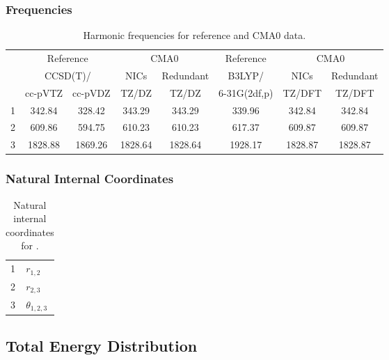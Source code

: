 \documentclass[10pt,oneside]{article}
\begin{document}
\begin{table}[h!]
\subsubsection*{Frequencies}
\centering
\caption{Harmonic frequencies for reference and CMA0 data.}
\begin{tabular}{cccccccc}
\toprule
{} & \multicolumn{2}{c}{Reference} & \multicolumn{2}{c}{CMA0} &    Reference & \multicolumn{2}{c}{CMA0} \\
{} & \multicolumn{2}{c}{CCSD(T)/} &    NICs &  Redundant &       B3LYP/ &    NICs & Redundant \\
{} &   cc-pVTZ & cc-pVDZ &   TZ/DZ &      TZ/DZ & 6-31G(2df,p) &  TZ/DFT &    TZ/DFT \\
\midrule
1 &    342.84 &  328.42 &  343.29 &     343.29 &       339.96 &  342.84 &    342.84 \\
2 &    609.86 &  594.75 &  610.23 &     610.23 &       617.37 &  609.87 &    609.87 \\
3 &   1828.88 & 1869.26 & 1828.64 &    1828.64 &      1928.17 & 1828.87 &   1828.87 \\
\bottomrule
\end{tabular}
\end{table}

\begin{table}[h!]
\subsubsection*{Natural Internal Coordinates}
\centering
\caption{Natural internal coordinates for .}
\small
\begin{tabular}{ll}
\toprule
  1   & $r_{1,2}$ \\
  2   & $r_{2,3}$ \\
  3   & $\theta_{1,2,3}$ \\
\bottomrule
\end{tabular}
\end{table}

\begin{table}
\subsection*{Total Energy Distribution}
\centering\end{table}

\clearpage

\subsection{}
\end{document}
